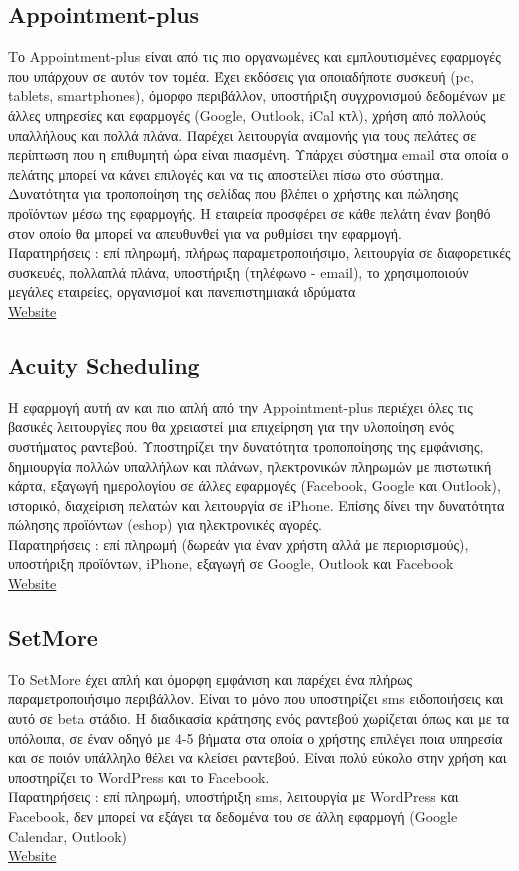 \documentclass[12pt]{article}
\begin{document}
\subsection{Appointment-plus}
Το Appointment-plus είναι από τις πιο οργανωμένες και εμπλουτισμένες εφαρμογές που υπάρχουν σε αυτόν τον τομέα. Έχει εκδόσεις για οποιαδήποτε συσκευή (pc, tablets, smartphones), όμορφο περιβάλλον, υποστήριξη συγχρονισμού δεδομένων με άλλες υπηρεσίες και εφαρμογές (Google, Outlook, iCal κτλ), χρήση από πολλούς υπαλλήλους και πολλά πλάνα. Παρέχει λειτουργία αναμονής για τους πελάτες σε περίπτωση που η επιθυμητή ώρα είναι πιασμένη. Υπάρχει σύστημα email στα οποία ο πελάτης μπορεί να κάνει επιλογές και να τις αποστείλει πίσω στο σύστημα. Δυνατότητα για τροποποίηση της σελίδας που βλέπει ο χρήστης και πώλησης προϊόντων μέσω της εφαρμογής. Η εταιρεία προσφέρει σε κάθε πελάτη έναν βοηθό στον οποίο θα μπορεί να απευθυνθεί για να ρυθμίσει την εφαρμογή. 
\\[0.3cm]
Παρατηρήσεις : επί πληρωμή, πλήρως παραμετροποιήσιμο, λειτουργία σε διαφορετικές συσκευές, πολλαπλά πλάνα, υποστήριξη (τηλέφωνο - email), το χρησιμοποιούν μεγάλες εταιρείες, οργανισμοί και πανεπιστημιακά ιδρύματα
\\[0.3cm]
\href{http://www.appointment-plus.com/}{Website}

\subsection{Acuity Scheduling}
Η εφαρμογή αυτή αν και πιο απλή από την Appointment-plus περιέχει όλες τις βασικές λειτουργίες που θα χρειαστεί μια επιχείρηση για την υλοποίηση ενός συστήματος ραντεβού. Υποστηρίζει την δυνατότητα τροποποίησης της εμφάνισης, δημιουργία πολλών υπαλλήλων και πλάνων, ηλεκτρονικών πληρωμών με πιστωτική κάρτα, εξαγωγή ημερολογίου σε άλλες εφαρμογές (Facebook, Google και Outlook), ιστορικό, διαχείριση πελατών και λειτουργία σε iPhone. Επίσης δίνει την δυνατότητα πώλησης προϊόντων (eshop) για ηλεκτρονικές αγορές.
\\[0.3cm]
Παρατηρήσεις : επί πληρωμή (δωρεάν για έναν χρήστη αλλά με περιορισμούς), υποστήριξη προϊόντων, iPhone, εξαγωγή σε Google, Outlook και Facebook
\\[0.3cm]
\href{http://www.acuityscheduling.com/}{Website}

\subsection{SetMore}
Το SetMore έχει απλή και όμορφη εμφάνιση και παρέχει ένα πλήρως παραμετροποιήσιμο περιβάλλον. Είναι το μόνο που υποστηρίζει sms ειδοποιήσεις και αυτό σε beta στάδιο. Η διαδικασία κράτησης ενός ραντεβού χωρίζεται όπως και με τα υπόλοιπα, σε έναν οδηγό με 4-5 βήματα στα οποία ο χρήστης επιλέγει ποια υπηρεσία και σε ποιόν υπάλληλο θέλει να κλείσει ραντεβού. Είναι πολύ εύκολο στην χρήση και υποστηρίζει το WordPress και το Facebook.
\\[0.3cm]
Παρατηρήσεις : επί πληρωμή, υποστήριξη sms, λειτουργία με WordPress και Facebook, δεν μπορεί να εξάγει τα δεδομένα του σε άλλη εφαρμογή (Google Calendar, Outlook)
\\[0.3cm]
\href{http://www.setmore.com/}{Website}
\end{document}
